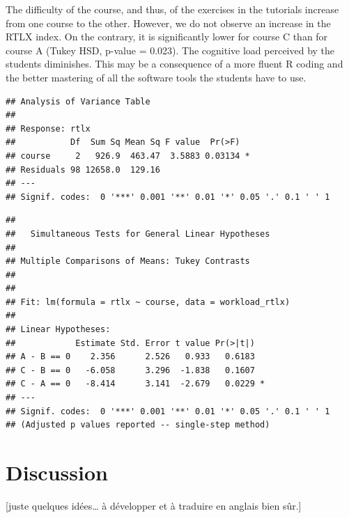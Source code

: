 \documentclass[
]{article}
\begin{document}
The difficulty of the course, and thus, of the exercises in the
tutorials increase from one course to the other. However, we do not
observe an increase in the RTLX index. On the contrary, it is
significantly lower for course C than for course A (Tukey HSD, p-value =
0.023). The cognitive load perceived by the students diminishes. This
may be a consequence of a more fluent R coding and the better mastering
of all the software tools the students have to use.

\begin{verbatim}
## Analysis of Variance Table
## 
## Response: rtlx
##           Df  Sum Sq Mean Sq F value  Pr(>F)  
## course     2   926.9  463.47  3.5883 0.03134 *
## Residuals 98 12658.0  129.16                  
## ---
## Signif. codes:  0 '***' 0.001 '**' 0.01 '*' 0.05 '.' 0.1 ' ' 1
\end{verbatim}

\begin{verbatim}
## 
##   Simultaneous Tests for General Linear Hypotheses
## 
## Multiple Comparisons of Means: Tukey Contrasts
## 
## 
## Fit: lm(formula = rtlx ~ course, data = workload_rtlx)
## 
## Linear Hypotheses:
##            Estimate Std. Error t value Pr(>|t|)  
## A - B == 0    2.356      2.526   0.933   0.6183  
## C - B == 0   -6.058      3.296  -1.838   0.1607  
## C - A == 0   -8.414      3.141  -2.679   0.0229 *
## ---
## Signif. codes:  0 '***' 0.001 '**' 0.01 '*' 0.05 '.' 0.1 ' ' 1
## (Adjusted p values reported -- single-step method)
\end{verbatim}

\hypertarget{discussion}{%
\section{Discussion}\label{discussion}}

{[}juste quelques idées\ldots{} à développer et à traduire en anglais
bien sûr.{]}
\end{document}
